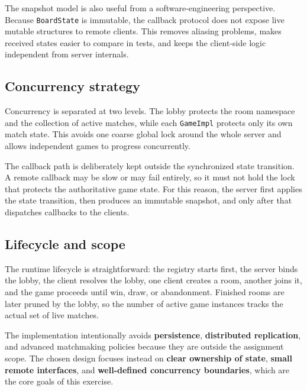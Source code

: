 The snapshot model is also useful from a software-engineering perspective.
Because \texttt{BoardState} is immutable, the callback protocol does not expose
live mutable structures to remote clients. This removes aliasing problems,
makes received states easier to compare in tests, and keeps the client-side
logic independent from server internals.

\subsection{Concurrency strategy}

Concurrency is separated at two levels. The lobby protects the room namespace
and the collection of active matches, while each \texttt{GameImpl} protects
only its own match state. This avoids one coarse global lock around the whole
server and allows independent games to progress concurrently.

The callback path is deliberately kept outside the synchronized state
transition. A remote callback may be slow or may fail entirely, so it must not
hold the lock that protects the authoritative game state. For this reason, the
server first applies the state transition, then produces an immutable snapshot,
and only after that dispatches callbacks to the clients.

\subsection{Lifecycle and scope}

The runtime lifecycle is straightforward: the registry starts first, the
server binds the lobby, the client resolves the lobby, one client creates a
room, another joins it, and the game proceeds until win, draw, or abandonment.
Finished rooms are later pruned by the lobby, so the number of active game
instances tracks the actual set of live matches.

The implementation intentionally avoids \textbf{persistence},
\textbf{distributed replication}, and advanced matchmaking policies because
they are outside the assignment scope. The chosen design focuses instead on
\textbf{clear ownership of state}, \textbf{small remote interfaces}, and
\textbf{well-defined concurrency boundaries}, which are the core goals of this
exercise.
